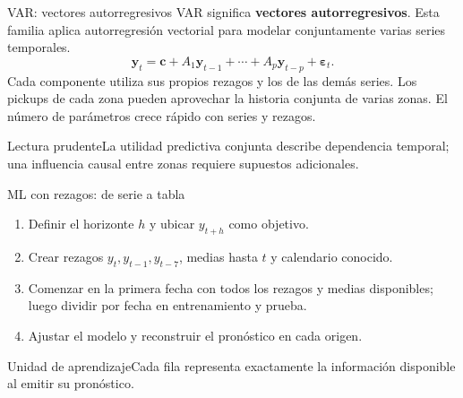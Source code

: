 \documentclass[aspectratio=169,10pt]{beamer}
\newcommand{\concepto}[1]{\textcolor{UAPTeal}{\textbf{#1}}}
\begin{document}
\begin{frame}{VAR: vectores autorregresivos}\small
VAR significa \concepto{vectores autorregresivos}. Esta familia aplica autorregresión vectorial para modelar conjuntamente varias series temporales.
\[\mathbf y_t=\mathbf c+A_1\mathbf y_{t-1}+\cdots+A_p\mathbf y_{t-p}+\boldsymbol\varepsilon_t.\]
Cada componente utiliza sus propios rezagos y los de las demás series. Los pickups de cada zona pueden aprovechar la historia conjunta de varias zonas. El número de parámetros crece rápido con series y rezagos.
\begin{alertblock}{Lectura prudente}La utilidad predictiva conjunta describe dependencia temporal; una influencia causal entre zonas requiere supuestos adicionales.\end{alertblock}
\end{frame}

\begin{frame}{ML con rezagos: de serie a tabla}\small
\centering{}\par\vspace{.4em}\raggedright
\begin{enumerate}\item Definir el horizonte $h$ y ubicar $y_{t+h}$ como objetivo.\item Crear rezagos $y_t,y_{t-1},y_{t-7}$, medias hasta $t$ y calendario conocido.\item Comenzar en la primera fecha con todos los rezagos y medias disponibles; luego dividir por fecha en entrenamiento y prueba.\item Ajustar el modelo y reconstruir el pronóstico en cada origen.\end{enumerate}
\begin{block}{Unidad de aprendizaje}Cada fila representa exactamente la información disponible al emitir su pronóstico.\end{block}
\end{frame}
\end{document}
